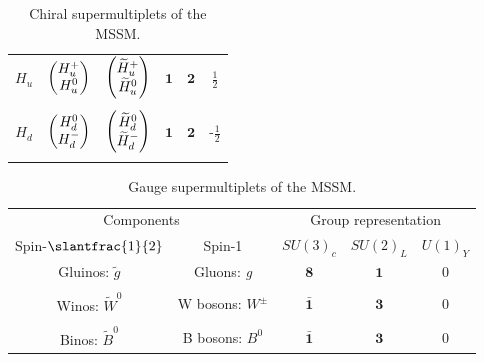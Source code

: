 \begin{table}
\begin{tabular}{cccccc}
    $H_u$          & $\begin{pmatrix} H_u^+ \\ H_u^0\end{pmatrix}$                       & $\begin{pmatrix} \widetilde{H}_u^+ \\ \widetilde{H}_u^0\end{pmatrix}$                              & $\mathbf{1}$       & $\mathbf{2}$ & $\frac{1}{2}$\\\\
    $H_d$          & $\begin{pmatrix} H_d^0 \\ H_d^-\end{pmatrix}$                       & $\begin{pmatrix} \widetilde{H}_d^0 \\ \widetilde{H}_d^-\end{pmatrix}$                              & $\mathbf{1}$       & $\mathbf{2}$ & -$\frac{1}{2}$\\\\
    \bottomrule
  \end{tabular}
  \caption{Chiral supermultiplets of the MSSM.}
  \label{tab:chiral_supermultiplets}
\end{table}

\begin{table}
  \begin{tabular}{ccccc}
    \toprule
\multicolumn{2}{c}{Components} & \multicolumn{3}{c}{Group representation} \\ \cmidrule(r){1-2}\cmidrule(l){3-5}
Spin-$\slantfrac{1}{2}$        & Spin-1                                                                         & $SU(3)_c$          & $SU(2)_L$    & $U(1)_Y$\\\midrule
Gluinos: $\widetilde{g}$       & Gluons: \emph{g}                                                               & $\mathbf{8}$       & $\mathbf{1}$ & 0 \\\\
Winos: $\widetilde{W}^0$       & W bosons: $W^\pm$                                                              & $\bar{\mathbf{1}}$ & $\mathbf{3}$ & 0\\\\
Binos: $\widetilde{B}^0$       & B bosons: $B^0$                                                                & $\bar{\mathbf{1}}$ & $\mathbf{3}$ & 0\\
    \bottomrule
  \end{tabular}
  \caption{Gauge supermultiplets of the MSSM.}
  \label{tab:gauge_supermultiplets}
\end{table}

